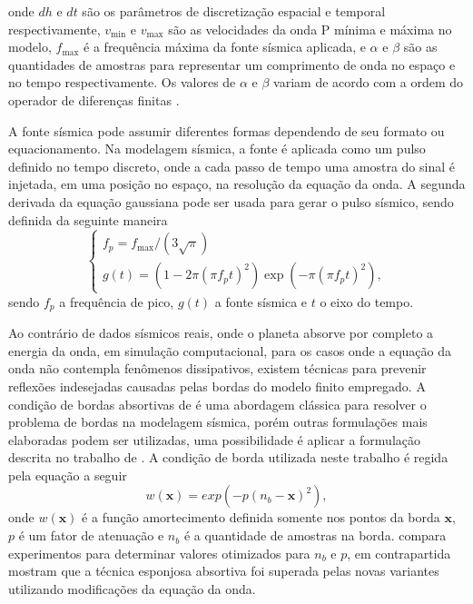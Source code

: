 \noindent onde $dh$ e $dt$ são os parâmetros de discretização espacial e temporal respectivamente, $v_{\text{min}}$ e $v_{\text{max}}$ são as velocidades da onda P mínima e máxima no modelo, $f_{\text{max}}$ é a frequência máxima da fonte sísmica aplicada, e $\alpha$ e $\beta$ são as quantidades de amostras para representar um comprimento de onda no espaço e no tempo respectivamente. Os valores de $\alpha$ e $\beta$ variam de acordo com a ordem do operador de diferenças finitas \cite{bulcao2004modelagem}.    

A fonte sísmica pode assumir diferentes formas dependendo de seu formato ou equacionamento. Na modelagem sísmica, a fonte é aplicada como um pulso definido no tempo discreto, onde a cada passo de tempo uma amostra do sinal é injetada, em uma posição no espaço, na resolução da equação da onda. A segunda derivada da equação gaussiana \cite{ricker1953form} pode ser usada para gerar o pulso sísmico, sendo definida da seguinte maneira
\begin{equation}
	\begin{cases}
		f_p = f_{\text{max}} / (3\sqrt{\pi}) \\
		g(t) = (1 - 2 \pi (\pi f_p t)^2) \exp(-\pi (\pi f_p t)^2),
	\end{cases}
\end{equation}
\noindent sendo $f_p$ a frequência de pico, $g(t)$ a fonte sísmica e $t$ o eixo do tempo. 

Ao contrário de dados sísmicos reais, onde o planeta absorve por completo a energia da onda, em simulação computacional, para os casos onde a equação da onda não contempla fenômenos dissipativos, existem técnicas para prevenir reflexões indesejadas causadas pelas bordas do modelo finito empregado. A condição de bordas absortivas de  é uma abordagem clássica para resolver o problema de bordas na modelagem sísmica, porém outras formulações mais elaboradas podem ser utilizadas, uma possibilidade é aplicar a formulação descrita no trabalho de . A condição de borda utilizada neste trabalho é regida pela equação a seguir
\begin{equation}
	w(\mathbf{x}) = exp(- p(n_b - \mathbf{x})^2),	
\end{equation}      
\noindent onde $w(\mathbf{x})$ é a função amortecimento definida somente nos pontos da borda $\mathbf{x}$, $p$ é um fator de atenuação e $n_b$ é a quantidade de amostras na borda.  compara experimentos para determinar valores otimizados para $n_b$ e $p$, em contrapartida  mostram que a técnica esponjosa absortiva foi superada pelas novas variantes utilizando modificações da equação da onda. 

